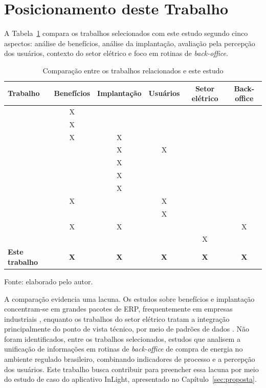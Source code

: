 \section{Posicionamento deste Trabalho}
\label{sec:rev-posicionamento}

A Tabela~\ref{tab:comparativo} compara os trabalhos selecionados com este estudo segundo cinco aspectos: análise de benefícios, análise da implantação, avaliação pela percepção dos usuários, contexto do setor elétrico e foco em rotinas de \textit{back-office}.

\begin{table}[H]
\centering
\caption{Comparação entre os trabalhos relacionados e este estudo}
\label{tab:comparativo}
\footnotesize
\setlength{\tabcolsep}{4pt}
\begin{tabular}{lccccc}
\toprule
\textbf{Trabalho} & \textbf{Benefícios} & \textbf{Implantação} & \textbf{Usuários} & \textbf{Setor elétrico} & \textbf{Back-office} \\ \midrule
\citet{hitt2002} & X & & & & \\ \midrule
\citet{hendricks2007} & X & & & & \\ \midrule
\citet{gattiker2005} & X & X & & & \\ \midrule
\citet{tong2015} & & X & X & & \\ \midrule
\citet{robey2002} & & X & & & \\ \midrule
\citet{finney2007} & & X & & & \\ \midrule
\citet{shaul2013} & & X & & & \\ \midrule
\citet{petter2008} & X & & X & & \\ \midrule
\citet{wixom2005} & & & X & & \\ \midrule
\citet{lacity2016} & X & X & & & X \\ \midrule
\citet{uslar2012} & & & & X & \\ \midrule
\textbf{Este trabalho} & \textbf{X} & \textbf{X} & \textbf{X} & \textbf{X} & \textbf{X} \\ \bottomrule
\end{tabular}

\vspace{0.2cm}
{\footnotesize Fonte: elaborado pelo autor.}
\end{table}

A comparação evidencia uma lacuna. Os estudos sobre benefícios e implantação concentram-se em grandes pacotes de ERP, frequentemente em empresas industriais \citep{gattiker2005,robey2002}, enquanto os trabalhos do setor elétrico tratam a integração principalmente do ponto de vista técnico, por meio de padrões de dados \citep{uslar2012}. Não foram identificados, entre os trabalhos selecionados, estudos que analisem a unificação de informações em rotinas de \textit{back-office} de compra de energia no ambiente regulado brasileiro, combinando indicadores de processo e a percepção dos usuários. Este trabalho busca contribuir para preencher essa lacuna por meio do estudo de caso do aplicativo InLight, apresentado no Capítulo~\ref{sec:proposta}.
